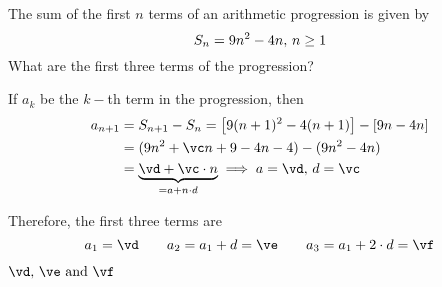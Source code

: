 

\MULTIPLY{}\vc
\SUBTRACT\va\vb\vd

\ADD\vd\vc\ve
\ADD\ve\vc\vf

\question[2] The sum of the first $n$ terms of an arithmetic progression is given by 
\[ S_n = 9 n^2 - 4 n,\, n \geq 1 \]
What are the first three terms of the progression? 

\watchout

\begin{solution}[\halfpage]
  If $a_k$ be the $k-$th term in the progression, then 
  \begin{align}
    a_{n+1} &= S_{n+1} - S_n = \left[ \va (n+1)^2 - \vb (n+1) \right] - \left[ \va n - \vb n\right] \\
     &= (\va n^2 + \vc n + \va -\vb n - \vb) - (\va n^2 - \vb n) \\ 
     &= \underbrace{\vd + \vc\cdot n}_{ = a + n\cdot d}\implies a = \vd,\, d = \vc
  \end{align}

  Therefore, the first three terms are 
  \[ a_1 = \vd\qquad a_2 = a_1 + d = \ve\qquad a_3 = a_1 + 2\cdot d = \vf \] 

\end{solution}

\ifprintanswers\begin{codex}$\vd,\,\ve\text{ and }\vf$\end{codex}\fi
